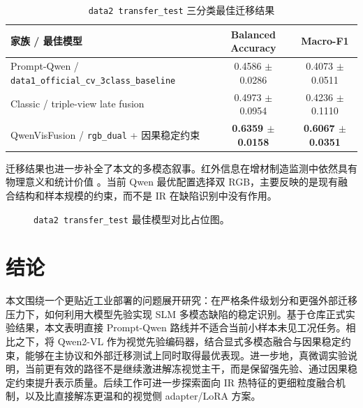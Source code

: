\begin{table}[!t]
\caption{\texttt{data2 transfer\_test} 三分类最佳迁移结果}
\label{tab:data2_transfer_cn}
\centering
\begin{tabular}{|l|c|c|}
\hline
家族 / 最佳模型 & Balanced Accuracy & Macro-F1 \\
\hline
Prompt-Qwen / \texttt{data1\_official\_cv\_3class\_baseline} & 0.4586 $\pm$ 0.0286 & 0.4073 $\pm$ 0.0511 \\
\hline
Classic / triple-view late fusion & 0.4973 $\pm$ 0.0954 & 0.4236 $\pm$ 0.1110 \\
\hline
QwenVisFusion / \texttt{rgb\_dual} + 因果稳定约束 & \textbf{0.6359 $\pm$ 0.0158} & \textbf{0.6067 $\pm$ 0.0351} \\
\hline
\end{tabular}
\end{table}

迁移结果也进一步补全了本文的多模态叙事。红外信息在增材制造监测中依然具有物理意义和统计价值 \cite{ref_lpbf_sensing_review,ref_intelligent_defect_pbf}。当前 Qwen 最优配置选择双 RGB，主要反映的是现有融合结构和样本规模的约束，而不是 IR 在缺陷识别中没有作用。

\begin{figure}[!t]
\centering
\fbox{\rule{0pt}{1.4in}\rule{0.95\columnwidth}{0pt}}
\caption{\texttt{data2 transfer\_test} 最佳模型对比占位图。}
\label{fig:data2_transfer_cn}
\end{figure}

\section{结论}
本文围绕一个更贴近工业部署的问题展开研究：在严格条件级划分和更强外部迁移压力下，如何利用大模型先验实现 SLM 多模态缺陷的稳定识别。基于仓库正式实验结果，本文表明直接 Prompt-Qwen 路线并不适合当前小样本未见工况任务。相比之下，将 Qwen2-VL 作为视觉先验编码器，结合显式多模态融合与因果稳定约束，能够在主协议和外部迁移测试上同时取得最优表现。进一步地，真微调实验说明，当前更有效的路径不是继续激进解冻视觉主干，而是保留强先验、通过因果稳定约束提升表示质量。后续工作可进一步探索面向 IR 热特征的更细粒度融合机制，以及比直接解冻更温和的视觉侧 adapter/LoRA 方案。

